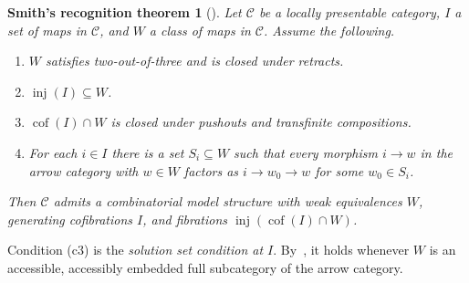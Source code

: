 \documentclass[12pt,a4paper]{amsart}
\newtheorem*{smithRecognition}{Smith's recognition theorem}
\theoremstyle{definition}
\begin{document}
\begin{smithRecognition}[{\cite[Definition~1.5 and Theorem~1.7]{MR1780498}}]
Let $\mathcal C$ be a locally presentable category, $I$ a set of maps in $\mathcal C$, and $W$ a class of maps in $\mathcal C$. Assume the following.
\begin{enumerate}
\item[\textup{(c0)}] $W$ satisfies two-out-of-three and is closed under retracts.
\item[\textup{(c1)}] $\operatorname{inj}(I)\subseteq W$.
\item[\textup{(c2)}] $\operatorname{cof}(I)\cap W$ is closed under pushouts and transfinite compositions.
\item[\textup{(c3)}] For each $i\in I$ there is a set $S_i\subseteq W$ such that every morphism $i\to w$ in the arrow category with $w\in W$ factors as $i\to w_0\to w$ for some $w_0\in S_i$.
\end{enumerate}
Then $\mathcal C$ admits a combinatorial model structure with weak equivalences $W$, generating cofibrations $I$, and fibrations $\operatorname{inj}(\operatorname{cof}(I)\cap W)$.
\end{smithRecognition}

Condition \textup{(c3)} is the \emph{solution set condition at $I$}. By~\cite[Definition~1.14 and Proposition~1.15]{MR1780498}, it holds whenever $W$ is an accessible, accessibly embedded full subcategory of the arrow category.
\end{document}
